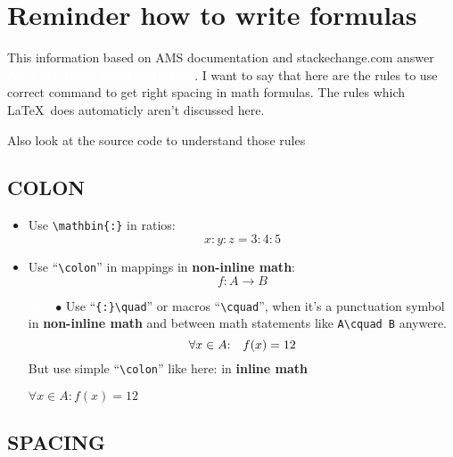 \documentclass[a5paper,openany,9pt]{extbook}
\begin{document}
\chapter*{Reminder how to write formulas}

This information based on AMS documentation and stackechange.com answer \colorbox{prpl}{\textcolor{white}{AND MY OWN PREFERENCES}}. I want to say that here are the rules to use correct command to get right spacing in math formulas. The rules which \LaTeX\ does automaticly aren't discussed here.

Also look at the source code to understand those rules

\section{COLON}

\begin{itemize}
\item
Use \verb|\mathbin{:}| in ratios:
$$x\mathbin{:}y\mathbin{:}z = 3\mathbin{:}4\mathbin{:}5$$

\item
Use ``\verb=\colon='' in mappings in \textbf{non-inline math}:
$$f\colon A \to B$$

\item[\colorbox{prpl}{\textcolor{white}{MY}}\ $\bullet$]
Use ``\verb={:}\quad='' or macros ``\verb=\cquad='', when it's a punctuation symbol in \textbf{non-inline math} and between math statements like \verb|A\cquad B| anywere.
$$\forall x \in A{:}\quad f(x) = 12$$
But use simple ``\verb=\colon='' like here: in \textbf{inline math}
\begin{center}
$\forall x \in A\colon f(x) = 12$
\end{center}


\end{itemize}
	
\section{SPACING}
\end{document}
